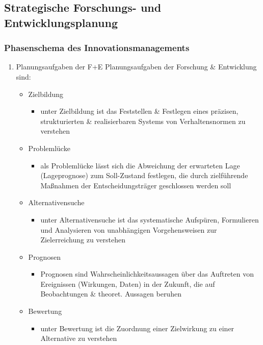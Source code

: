 \documentclass[11pt]{article}
\begin{document}
\subsection{Strategische Forschungs- und Entwicklungsplanung}
\label{sec:org137cc06}
\subsubsection{Phasenschema des Innovationsmanagements}
\label{sec:org4ba77a2}
\begin{enumerate}
\item Planungsaufgaben der F+E
\label{sec:org3dd48e0}
Planungsaufgaben der Forschung \& Entwicklung sind:
\begin{itemize}
\item Zielbildung
\begin{itemize}
\item unter Zielbildung ist das Feststellen \& Festlegen eines präzisen, strukturierten \& realisierbaren Systems von Verhaltensnormen zu verstehen
\end{itemize}
\item Problemlücke
\begin{itemize}
\item als Problemlücke lässt sich die Abweichung der erwarteten Lage (Lageprognose) zum Soll-Zustand festlegen, die durch zielführende Maßnahmen der Entscheidungsträger geschlossen werden soll
\end{itemize}
\item Alternativensuche
\begin{itemize}
\item unter Alternativensuche ist das systematische Aufspüren, Formulieren und Analysieren von unabhängigen Vorgehensweisen zur Zielerreichung zu verstehen
\end{itemize}
\item Prognosen
\begin{itemize}
\item Prognosen sind Wahrscheinlichkeitsaussagen über das Auftreten von Ereignissen (Wirkungen, Daten) in der Zukunft, die auf Beobachtungen \& theoret. Aussagen beruhen
\end{itemize}
\item Bewertung
\begin{itemize}
\item unter Bewertung ist die Zuordnung einer Zielwirkung zu einer Alternative zu verstehen
\end{itemize}
\end{itemize}



\end{enumerate}
\end{document}
